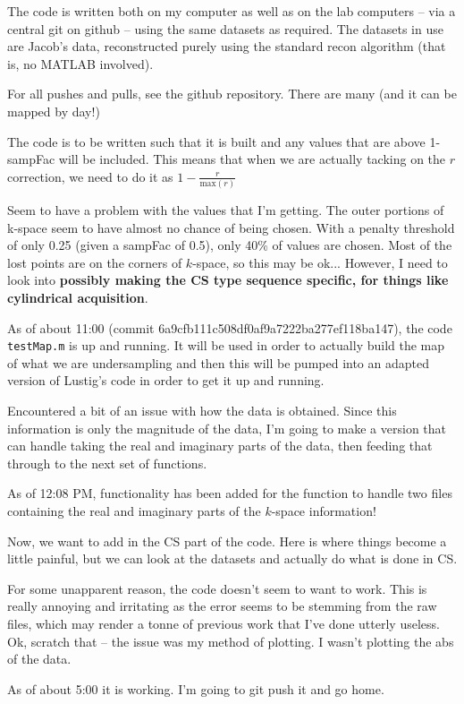 \documentclass[pra,11 pt]{revtex4-1}
\begin{document}
The code is written both on my computer as well as on the lab computers -- via a central git on github -- using the same datasets as required. The datasets in use are Jacob's data, reconstructed purely using the standard recon algorithm (that is, no MATLAB involved).

For all pushes and pulls, see the github repository. There are many (and it can be mapped by day!)

The code is to be written such that it is built and any values that are above 1-sampFac will be included. This means that when we are actually tacking on the $r$ correction, we need to do it as $1-\frac{r}{\text{max}(r)}$

Seem to have a problem with the values that I'm getting. The outer portions of k-space seem to have almost no chance of being chosen. With a penalty threshold of only 0.25 (given a sampFac of 0.5), only 40\% of values are chosen. Most of the lost points are on the corners of $k$-space, so this may be ok... However, I need to look into \textbf{possibly making the CS type sequence specific, for things like cylindrical acquisition}.

As of about 11:00 (commit 6a9cfb111c508df0af9a7222ba277ef118ba147), the code \texttt{testMap.m} is up and running. It will be used in order to actually build the map of what we are undersampling and then this will be pumped into an adapted version of Lustig's code in order to get it up and running.

Encountered a bit of an issue with how the data is obtained. Since this information is only the magnitude of the data, I'm going to make a version that can handle taking the real and imaginary parts of the data, then feeding that through to the next set of functions.

As of 12:08 PM, functionality has been added for the function to handle two files containing the real and imaginary parts of the $k$-space information!

Now, we want to add in the CS part of the code. Here is where things become a little painful, but we can look at the datasets and actually do what is done in CS.

For some unapparent reason, the code doesn't seem to want to work. This is really annoying and irritating as the error seems to be stemming from the raw files, which may render a tonne of previous work that I've done utterly useless. Ok, scratch that -- the issue was my method of plotting. I wasn't plotting the abs of the data. 

As of about 5:00 it is working. I'm going to git push it and go home.
\end{document}
